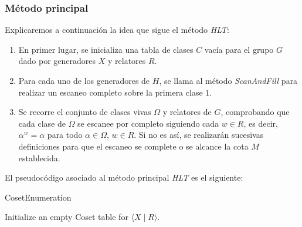 \subsubsection{Método principal}


Explicaremos a continuación la idea que sigue el método  \textit{HLT}:
\begin{enumerate}
    \item En primer lugar, se inicializa una tabla de clases $C$ vacía para el grupo $G$ dado por generadores $X$ y relatores $R$.
    \item Para cada uno de los generadores de $H$, se llama al método \textit{ScanAndFill} para realizar un escaneo completo sobre la primera clase $1$.
    

    
    \item Se recorre el conjunto de clases vivas $\Omega$ y relatores de $G$, comprobando que cada clase de $\Omega$ se escanee por completo siguiendo cada  $w \in R$, es decir, $\alpha^w=\alpha$ para todo $\alpha \in \Omega$, $w\in R$. Si no es así, se realizarán sucesivas definiciones para que el escaneo se complete o se alcance la cota $M$ establecida.

\end{enumerate}


El pseudocódigo asociado al método principal \textit{HLT} es el siguiente:
\begin{center}
\begin{minipage}{.7\linewidth}
    \begin{algorithm}[H] 
    \SetAlgoLined
    	\caption{CosetEnumeration}
            
            Initialize an empty Coset table for $\langle X\mid R \rangle$. \\
    	    
    	    
    	
    \end{algorithm} 
\end{minipage}
\end{center}



